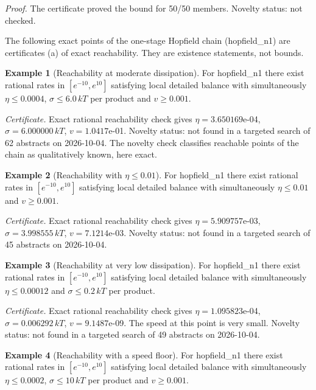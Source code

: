 \documentclass[10pt,twocolumn]{article}
\theoremstyle{definition}\newtheorem{definition}{Definition}\newtheorem{example}{Example}
\begin{document}
\emph{Proof.} The certificate proved the bound for 50/50 members. Novelty status: not checked.

The following exact points of the one-stage Hopfield chain (hopfield\_n1) are certificates (a) of exact reachability. They are existence statements, not bounds.

\begin{example}[Reachability at moderate dissipation]
For hopfield\_n1 there exist rational rates in \([e^{-10}, e^{10}]\) satisfying local detailed balance with simultaneously \(\eta \leq 0.0004\), \(\sigma \leq 6.0\,kT\) per product and \(v \geq 0.001\).
\end{example}

\emph{Certificate.} Exact rational reachability check gives \(\eta = 3.650169\)e-04, \(\sigma = 6.000000\,kT\), \(v = 1.0417\)e-01. Novelty status: not found in a targeted search of 62 abstracts on 2026-10-04. The novelty check classifies reachable points of the chain as qualitatively known, here exact.

\begin{example}[Reachability with $\eta \leq 0.01$]
For hopfield\_n1 there exist rational rates in \([e^{-10}, e^{10}]\) satisfying local detailed balance with simultaneously \(\eta \leq 0.01\) and \(v \geq 0.001\).
\end{example}

\emph{Certificate.} Exact rational reachability check gives \(\eta = 5.909757\)e-03, \(\sigma = 3.998555\,kT\), \(v = 7.1214\)e-03. Novelty status: not found in a targeted search of 45 abstracts on 2026-10-04.

\begin{example}[Reachability at very low dissipation]
For hopfield\_n1 there exist rational rates in \([e^{-10}, e^{10}]\) satisfying local detailed balance with simultaneously \(\eta \leq 0.00012\) and \(\sigma \leq 0.2\,kT\) per product.
\end{example}

\emph{Certificate.} Exact rational reachability check gives \(\eta = 1.095823\)e-04, \(\sigma = 0.006292\,kT\), \(v = 9.1487\)e-09. The speed at this point is very small. Novelty status: not found in a targeted search of 49 abstracts on 2026-10-04.

\begin{example}[Reachability with a speed floor]
For hopfield\_n1 there exist rational rates in \([e^{-10}, e^{10}]\) satisfying local detailed balance with simultaneously \(\eta \leq 0.0002\), \(\sigma \leq 10\,kT\) per product and \(v \geq 0.001\).
\end{example}
\end{document}

